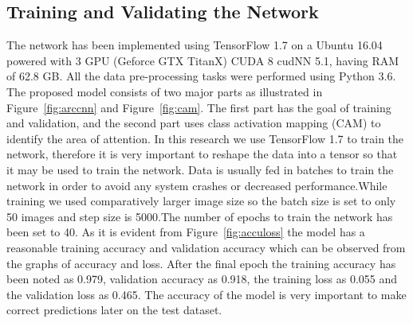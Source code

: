 \documentclass{bioinfo}
\begin{document}
\subsection{Training and Validating the Network}
The network has been implemented using TensorFlow 1.7 on a Ubuntu 16.04 powered with 3 GPU (Geforce GTX TitanX) CUDA 8 cudNN 5.1, having RAM of 62.8 GB. All the data pre-processing tasks were performed using Python 3.6.
The proposed model consists of two major parts as illustrated in Figure~\ref{fig:arccnn} and Figure~\ref{fig:cam}. The first part has the goal of training and validation, and the second part uses class activation mapping (CAM) to identify the area of attention.
In this research we use TensorFlow 1.7 to train the network, therefore it is very important to reshape the data into a tensor so that it may be used to train the network. Data is usually fed in batches to train the network in order to avoid any system crashes or decreased performance.While training we used comparatively larger image size so the batch size is set to only 50 images and step size is 5000.The number of epochs to train the network has been set to 40. As it is evident from Figure~\ref{fig:acculoss} the model has a reasonable training accuracy and validation accuracy which can be observed from the graphs of accuracy and loss. After the final epoch the training accuracy has been noted as 0.979, validation accuracy as 0.918, the training loss as 0.055 and the validation loss as 0.465. The accuracy of the model is very important to make correct predictions later on the test dataset. 
\end{document}
